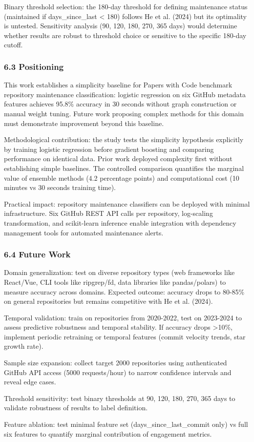 Binary threshold selection: the 180-day threshold for defining maintenance status (maintained if days\_since\_last < 180) follows He et al. (2024) but its optimality is untested. Sensitivity analysis (90, 120, 180, 270, 365 days) would determine whether results are robust to threshold choice or sensitive to the specific 180-day cutoff.

\subsubsection{6.3 Positioning}

This work establishes a simplicity baseline for Papers with Code benchmark repository maintenance classification: logistic regression on six GitHub metadata features achieves 95.8\% accuracy in 30 seconds without graph construction or manual weight tuning. Future work proposing complex methods for this domain must demonstrate improvement beyond this baseline.

Methodological contribution: the study tests the simplicity hypothesis explicitly by training logistic regression before gradient boosting and comparing performance on identical data. Prior work deployed complexity first without establishing simple baselines. The controlled comparison quantifies the marginal value of ensemble methods (4.2 percentage points) and computational cost (10 minutes vs 30 seconds training time).

Practical impact: repository maintenance classifiers can be deployed with minimal infrastructure. Six GitHub REST API calls per repository, log-scaling transformation, and scikit-learn inference enable integration with dependency management tools for automated maintenance alerts.

\subsubsection{6.4 Future Work}

Domain generalization: test on diverse repository types (web frameworks like React/Vue, CLI tools like ripgrep/fd, data libraries like pandas/polars) to measure accuracy across domains. Expected outcome: accuracy drops to 80-85\% on general repositories but remains competitive with He et al. (2024).

Temporal validation: train on repositories from 2020-2022, test on 2023-2024 to assess predictive robustness and temporal stability. If accuracy drops >10\%, implement periodic retraining or temporal features (commit velocity trends, star growth rate).

Sample size expansion: collect target 2000 repositories using authenticated GitHub API access (5000 requests/hour) to narrow confidence intervals and reveal edge cases.

Threshold sensitivity: test binary thresholds at 90, 120, 180, 270, 365 days to validate robustness of results to label definition.

Feature ablation: test minimal feature set (days\_since\_last\_commit only) vs full six features to quantify marginal contribution of engagement metrics.
